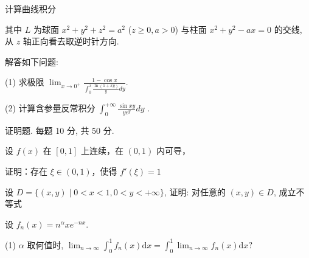 \par{}
计算曲线积分\par
\nopagebreak[4]
其中 $L$ 为球面 $x^{2} + y^{2} + z^{2} = a^{2}$ ($z \geq 0, a > 0$) 与柱面 $x^{2} + y^{2} - ax = 0$ 的交线, 从 $z$ 轴正向看去取逆时针方向.\par
解答如下问题:\par
(1) 求极限  $\lim_{x\to0^{+}}\frac{1-\cos x}{\int_{0}^{x}\frac{\ln(1+xy)}{y}dy}.$\par
(2) 计算含参量反常积分  $\int_{0}^{+\infty}\frac{\sin xy}{ye^{y}}dy$ .\par
\par{}
证明题. 每题 10 分, 共 50 分.\par
\par{}
设 $f(x)$ 在 $[0,1]$ 上连续，在 $(0,1)$ 内可导，\par
\nopagebreak[4]
证明：存在 $\xi \in (0,1)$，使得 $f'(\xi) = 1$\par
\par{}
设 $D = \{(x, y) \mid 0 < x < 1, 0 < y < +\infty\}$, 证明: 对任意的 $(x, y) \in D$, 成立不等式\par
\nopagebreak[4]
设 $f_{n}(x) = n^{\alpha}xe^{-nx}$.\par
(1) $\alpha$ 取何值时, $\lim_{n\to \infty}\int_0^1 f_n(x)\mathrm{d}x = \int_0^1\lim_{n\to \infty}f_n(x)\mathrm{d}x?$\par
